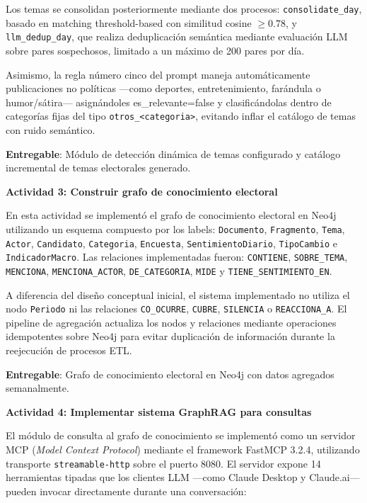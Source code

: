 Los temas se consolidan posteriormente mediante dos procesos: \texttt{consolidate\_day}, basado en matching threshold-based con similitud cosine $\geq 0.78$, y \texttt{llm\_dedup\_day}, que realiza deduplicación semántica mediante evaluación LLM sobre pares sospechosos, limitado a un máximo de 200 pares por día.

Asimismo, la regla número cinco del prompt maneja automáticamente publicaciones no políticas —como deportes, entretenimiento, farándula o humor/sátira— asignándoles es\_relevante=false y clasificándolas dentro de categorías fijas del tipo \texttt{otros\_<categoria>}, evitando inflar el catálogo de temas con ruido semántico.
 
\textbf{Entregable}: Módulo de detección dinámica de temas configurado y catálogo incremental de temas electorales generado.
 
\textbf{Actividad 3: Construir grafo de conocimiento electoral}
 
En esta actividad se implementó el grafo de conocimiento electoral en Neo4j utilizando un esquema compuesto por los labels: \texttt{Documento}, \texttt{Fragmento}, \texttt{Tema}, \texttt{Actor}, \texttt{Candidato}, \texttt{Categoria}, \texttt{Encuesta}, \texttt{SentimientoDiario}, \texttt{TipoCambio} e \texttt{IndicadorMacro}. Las relaciones implementadas fueron: \texttt{CONTIENE}, \texttt{SOBRE\_TEMA}, \texttt{MENCIONA}, \texttt{MENCIONA\_ACTOR}, \texttt{DE\_CATEGORIA}, \texttt{MIDE} y \texttt{TIENE\_SENTIMIENTO\_EN}.

A diferencia del diseño conceptual inicial, el sistema implementado no utiliza el nodo \texttt{Periodo} ni las relaciones \texttt{CO\_OCURRE}, \texttt{CUBRE}, \texttt{SILENCIA} o \texttt{REACCIONA\_A}. El pipeline de agregación actualiza los nodos y relaciones mediante operaciones idempotentes sobre Neo4j para evitar duplicación de información durante la reejecución de procesos ETL.
 
\textbf{Entregable}: Grafo de conocimiento electoral en Neo4j con datos agregados semanalmente.
 
\textbf{Actividad 4: Implementar sistema GraphRAG para consultas}
 
El módulo de consulta al grafo de conocimiento se implementó como un servidor MCP (\textit{Model Context Protocol}) mediante el framework FastMCP 3.2.4, utilizando transporte \texttt{streamable-http} sobre el puerto 8080. El servidor expone 14 herramientas tipadas que los clientes LLM —como Claude Desktop y Claude.ai— pueden invocar directamente durante una conversación:

